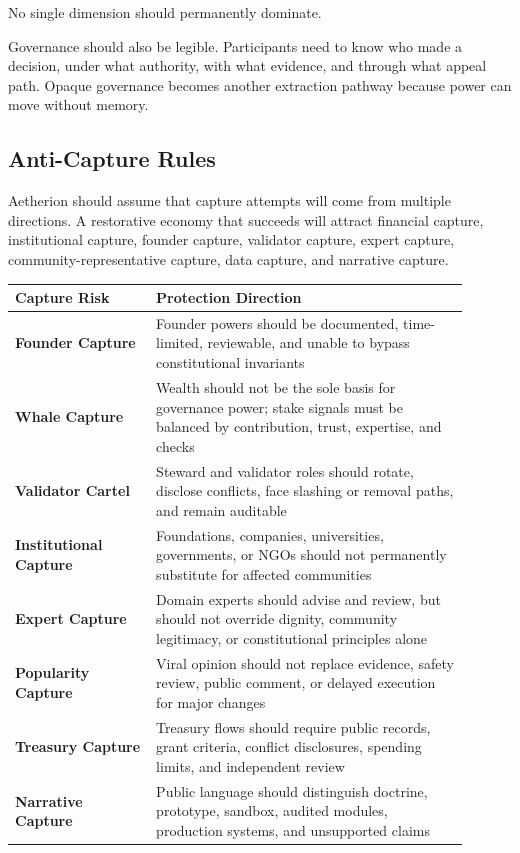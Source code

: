 \documentclass[12pt]{article}
\begin{document}
No single dimension should permanently dominate.

Governance should also be legible. Participants need to know who made a decision, under what authority, with what evidence, and through what appeal path. Opaque governance becomes another extraction pathway because power can move without memory.

\subsection{Anti-Capture Rules}

Aetherion should assume that capture attempts will come from multiple directions. A restorative economy that succeeds will attract financial capture, institutional capture, founder capture, validator capture, expert capture, community-representative capture, data capture, and narrative capture.

\begin{longtable}{>{\bfseries}p{0.28\linewidth}p{0.62\linewidth}}
\toprule
Capture Risk & Protection Direction \\
\midrule
Founder Capture & Founder powers should be documented, time-limited, reviewable, and unable to bypass constitutional invariants \\
Whale Capture & Wealth should not be the sole basis for governance power; stake signals must be balanced by contribution, trust, expertise, and checks \\
Validator Cartel & Steward and validator roles should rotate, disclose conflicts, face slashing or removal paths, and remain auditable \\
Institutional Capture & Foundations, companies, universities, governments, or NGOs should not permanently substitute for affected communities \\
Expert Capture & Domain experts should advise and review, but should not override dignity, community legitimacy, or constitutional principles alone \\
Popularity Capture & Viral opinion should not replace evidence, safety review, public comment, or delayed execution for major changes \\
Treasury Capture & Treasury flows should require public records, grant criteria, conflict disclosures, spending limits, and independent review \\
Narrative Capture & Public language should distinguish doctrine, prototype, sandbox, audited modules, production systems, and unsupported claims \\
\bottomrule
\end{longtable}
\end{document}
